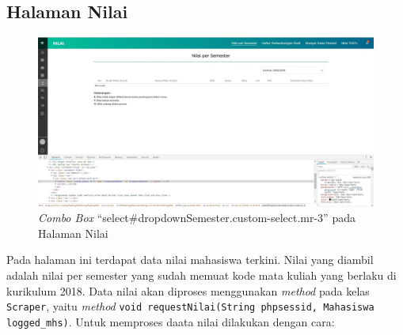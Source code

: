 \subsection{Halaman Nilai}
		\begin{figure}[H]
			\centering
			\includegraphics[scale=0.3]{Gambar/Nilai_combobox_user}
			\caption{\textit{Combo Box} ``select\#dropdownSemester.custom-select.mr-3'' pada Halaman Nilai}
			\label{pic:nilai_combobox_user}
		\end{figure}
Pada halaman ini terdapat data nilai mahasiswa terkini. Nilai yang diambil adalah nilai per semester yang sudah memuat kode mata kuliah yang berlaku di kurikulum 2018. Data nilai akan diproses menggunakan \textit{method} pada kelas \texttt{Scraper}, yaitu \textit{method} \texttt{void requestNilai(String phpsessid, Mahasiswa logged\_mhs)}. Untuk memproses daata nilai dilakukan dengan cara:
